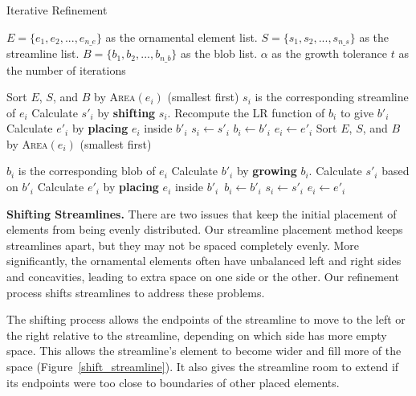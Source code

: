 \begin{algorithm}
\caption{Iterative Refinement} 
\label{iterative_refinement_algorithm}
\begin{algorithmic} 
\REQUIRE $E = \{ e_{1}, e_{2},... , e_{n\text{\_}e} \}$ as the ornamental element list. 
\REQUIRE $S = \{ s_{1}, s_{2},... , s_{n\text{\_}s} \}$ as the streamline list.
\REQUIRE $B = \{ b_{1}, b_{2},... , b_{n\text{\_}b} \}$ as the blob list.
\REQUIRE $\alpha$ as the growth tolerance
\REQUIRE $t$ as the number of iterations

  \STATE Sort $E$, $S$, and $B$ by \textsc{Area}$(e_{i})$ (smallest first)
  	\STATE $s_{i}$ is the corresponding streamline of $e_{i}$
    \STATE Calculate $s'_{i}$ by \textbf{shifting} $s_{i}$.
    \STATE Recompute the LR function of $b_{i}$ to give $b'_{i}$
    \STATE Calculate $e'_{i}$ by \textbf{placing} $e_{i}$ inside $b'_{i}$
        \STATE $s_{i} \leftarrow s'_{i}$
        \STATE $b_{i} \leftarrow b'_{i}$
    	\STATE $e_{i} \leftarrow e'_{i}$ 
    \ENDIF
  \ENDFOR
  \STATE Sort $E$, $S$, and $B$ by \textsc{Area}$(e_{i})$ (smallest first)

  	\STATE $b_{i}$ is the corresponding blob of $e_{i}$
    \STATE Calculate $b'_{i}$ by \textbf{growing} $b_{i}$.
    \STATE Calculate $s'_{i}$ based on $b'_{i}$ 
    \STATE Calculate $e'_{i}$ by \textbf{placing} $e_{i}$ inside $b'_{i}$\
    \STATE $b_{i} \leftarrow b'_{i}$
        \STATE $s_{i} \leftarrow s'_{i}$
    	\STATE $e_{i} \leftarrow e'_{i}$ 
    \ENDIF
  \ENDFOR

\ENDFOR
\end{algorithmic}
\end{algorithm}





\textbf{Shifting Streamlines.}
There are two issues that keep the initial placement of elements from being
evenly
distributed. Our streamline placement method keeps streamlines apart,
but they may not be spaced completely evenly. More significantly, the
ornamental elements often have unbalanced left and right sides and concavities,
leading to extra space on one side or the other.  Our refinement process
shifts streamlines to address these problems.

The shifting process allows the endpoints of the streamline to move to the
left or the right relative to the streamline, depending on which side has more empty space.
This allows the streamline's element to become wider and fill more of the space
(Figure~\ref{shift_streamline}). It also gives the streamline room to
extend if its endpoints were too close to boundaries of other placed
elements.

